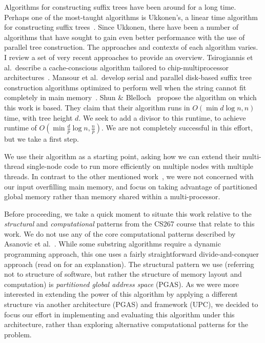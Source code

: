 \documentclass[10pt]{article}
\begin{document}
Algorithms for constructing suffix trees have been around for a long time.
Perhaps one of the most-taught algorithms is Ukkonen's, a linear time algorithm for constructing
suffix trees~\cite{ukkonen_online_1995}.
Since Ukkonen, there have been a number of algorithms that have sought to gain even better
performance with the use of parallel tree construction.
The approaches and contexts of each algorithm varies.
I review a set of very recent approaches to provide an overview.
Tsirogiannis et al.\ describe a cache-conscious algorithm tailored to chip-multiprocessor
architectures~\cite{tsirogiannis_suffix_2010}.
Mansour et al.\ develop serial and parallel disk-based suffix tree construction algorithms
optimized to perform well when the string cannot fit completely in main memory~\cite{mansour_era_2011}.
Shun \& Blelloch~\cite{shun_simple_2014} propose the algorithm on which this work is based.
They claim that their algorithm runs in $O\left(\min{d \log n, n}\right)$ time, 
with tree height $d$.
We seek to add a divisor to this runtime, to achieve runtime of
$O\left(\min{\frac{d}{p} \log n, \frac{n}{p}}\right)$.
We are not completely successful in this effort, but we take a first step.

We use their algorithm as a starting point, asking how we can extend their multi-thread single-node
code to run more efficiently on multiple nodes with multiple threads.
In contrast to the other mentioned work~\cite{tsirogiannis_suffix_2010,mansour_era_2011}, we were
not concerned with our input overfilling main memory, and focus on taking advantage of partitioned
global memory rather than memory shared within a multi-processor.

Before proceeding, we take a quick moment to situate this work relative to the \emph{structural}
and \emph{computational} patterns from the CS267 course that relate to this work.
We do not use any of the core computational patterns described by Asanovic et
al.~\cite{asanovic_view_2009}.
While some substring algorithms require a dynamic programming approach, this one uses a fairly
straightforward divide-and-conquer approach (read on for an explanation).
The structural pattern we use (referring not to structure of software, but rather the structure
of memory layout and computation) is \emph{partitioned global address space} (PGAS).
As we were more interested in extending the power of this algorithm by applying a different
structure via another architecture (PGAS) and framework (UPC), we decided to focus our effort in
implementing and evaluating this algorithm under this architecture, rather than exploring
alternative computational patterns for the problem.
\end{document}
